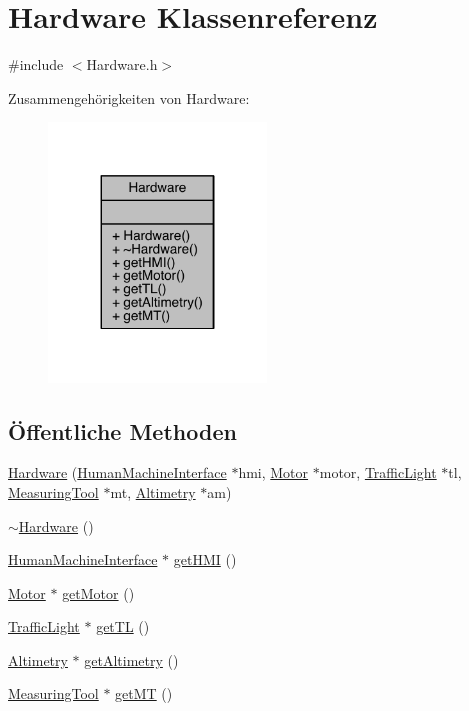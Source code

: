 \hypertarget{class_hardware}{}\section{Hardware Klassenreferenz}
\label{class_hardware}


{\ttfamily \#include $<$Hardware.\+h$>$}



Zusammengehörigkeiten von Hardware\+:\nopagebreak
\begin{figure}[H]
\begin{center}
\leavevmode
\includegraphics[width=164pt]{class_hardware__coll__graph}
\end{center}
\end{figure}
\subsection*{Öffentliche Methoden}
\begin{DoxyCompactItemize}
\item 
\hyperlink{class_hardware_aeda7f2e883005df9488865d9b1ea1994}{Hardware} (\hyperlink{class_human_machine_interface}{Human\+Machine\+Interface} $\ast$hmi, \hyperlink{class_motor}{Motor} $\ast$motor, \hyperlink{class_traffic_light}{Traffic\+Light} $\ast$tl, \hyperlink{class_measuring_tool}{Measuring\+Tool} $\ast$mt, \hyperlink{class_altimetry}{Altimetry} $\ast$am)
\item 
\hyperlink{class_hardware_a92901a44130552d28485409bcf6906f5}{$\sim$\+Hardware} ()
\item 
\hyperlink{class_human_machine_interface}{Human\+Machine\+Interface} $\ast$ \hyperlink{class_hardware_aec8f013270ef5d6e79afed214b5c18cf}{get\+H\+MI} ()
\item 
\hyperlink{class_motor}{Motor} $\ast$ \hyperlink{class_hardware_a0a896143b14292ea1805d43e384b4fa1}{get\+Motor} ()
\item 
\hyperlink{class_traffic_light}{Traffic\+Light} $\ast$ \hyperlink{class_hardware_a558325fc00a829ca20112234a961b153}{get\+TL} ()
\item 
\hyperlink{class_altimetry}{Altimetry} $\ast$ \hyperlink{class_hardware_afa1aaabe0d2433e35e6efd735fa15daf}{get\+Altimetry} ()
\item 
\hyperlink{class_measuring_tool}{Measuring\+Tool} $\ast$ \hyperlink{class_hardware_a6acc1b03b3c39ddbd681058f49e9f1bd}{get\+MT} ()
\end{DoxyCompactItemize}


